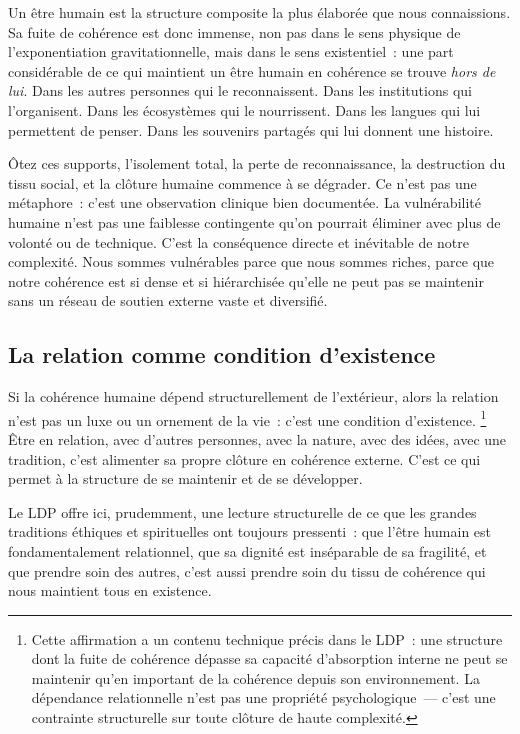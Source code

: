 \documentclass[12pt, a4paper, openright]{book}
\begin{document}
\medskip

Un être humain est la structure composite la plus élaborée que nous connaissions. Sa fuite de cohérence est donc immense, non pas dans le sens physique de l'exponentiation gravitationnelle, mais dans le sens existentiel~: une part considérable de ce qui maintient un être humain en cohérence se trouve \emph{hors de lui}. Dans les autres personnes qui le reconnaissent. Dans les institutions qui l'organisent. Dans les écosystèmes qui le nourrissent. Dans les langues qui lui permettent de penser. Dans les souvenirs partagés qui lui donnent une histoire.

\medskip

Ôtez ces supports, l'isolement total, la perte de reconnaissance, la destruction du tissu social, et la clôture humaine commence à se dégrader. Ce n'est pas une métaphore~: c'est une observation clinique bien documentée. La vulnérabilité humaine n'est pas une faiblesse contingente qu'on pourrait éliminer avec plus de volonté ou de technique. C'est la conséquence directe et inévitable de notre complexité. Nous sommes vulnérables parce que nous sommes riches, parce que notre cohérence est si dense et si hiérarchisée qu'elle ne peut pas se maintenir sans un réseau de soutien externe vaste et diversifié.

\subsection*{La relation comme condition d'existence}

Si la cohérence humaine dépend structurellement de l'extérieur, alors la relation n'est pas un luxe ou un ornement de la vie~: c'est une condition d'existence. 
  \footnote{Cette affirmation a un contenu technique précis dans le LDP~: une structure dont la fuite de cohérence dépasse sa capacité d'absorption interne ne peut se maintenir qu'en important de la cohérence depuis son environnement. La dépendance relationnelle n'est pas une propriété psychologique~--- c'est une contrainte structurelle sur toute clôture de haute complexité.}
Être en relation, avec d'autres personnes, avec la nature, avec des idées, avec une tradition, c'est alimenter sa propre clôture en cohérence externe. C'est ce qui permet à la structure de se maintenir et de se développer.

\medskip

Le LDP offre ici, prudemment, une lecture structurelle de ce que les grandes traditions éthiques et spirituelles ont toujours pressenti~: que l'être humain est fondamentalement relationnel, que sa dignité est inséparable de sa fragilité, et que prendre soin des autres, c'est aussi prendre soin du tissu de cohérence qui nous maintient tous en existence.
\end{document}
